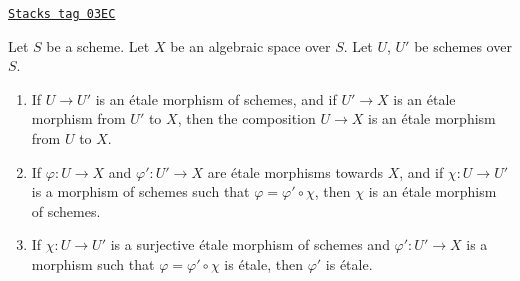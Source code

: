\begin{lemma}
\label{spaces-properties-lemma-etale-over-space}
\href{https://stacks.math.columbia.edu/tag/03EC}{\texttt{Stacks tag 03EC}}

Let $S$ be a scheme.
Let $X$ be an algebraic space over $S$.
Let $U$, $U'$ be schemes over $S$.
\begin{enumerate}
\item If $U \to U'$ is an \'etale morphism of schemes, and
if $U' \to X$ is an \'etale morphism from $U'$ to $X$, then the
composition $U \to X$ is an \'etale morphism from $U$ to $X$.
\item If $\varphi : U \to X$ and $\varphi' : U' \to X$ are
\'etale morphisms towards $X$, and if $\chi : U \to U'$ is a
morphism of schemes such that $\varphi = \varphi' \circ \chi$,
then $\chi$ is an \'etale morphism of schemes.
\item If $\chi : U \to U'$ is a surjective \'etale morphism
of schemes and $\varphi' : U' \to X$ is a morphism such that
$\varphi = \varphi' \circ \chi$ is \'etale, then $\varphi'$
is \'etale.
\end{enumerate}
\end{lemma}

